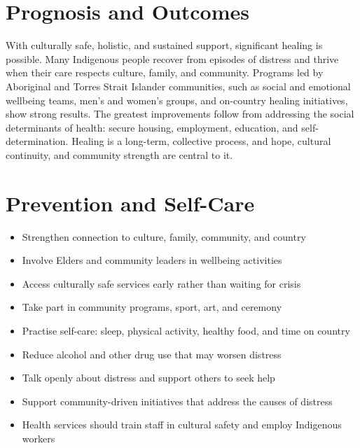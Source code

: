 \section*{Prognosis and Outcomes}
With culturally safe, holistic, and sustained support, significant healing is possible. Many Indigenous people recover from episodes of distress and thrive when their care respects culture, family, and community. Programs led by Aboriginal and Torres Strait Islander communities, such as social and emotional wellbeing teams, men's and women's groups, and on-country healing initiatives, show strong results. The greatest improvements follow from addressing the social determinants of health: secure housing, employment, education, and self-determination. Healing is a long-term, collective process, and hope, cultural continuity, and community strength are central to it.

\section*{Prevention and Self-Care}
\begin{itemize}
    \item Strengthen connection to culture, family, community, and country
    \item Involve Elders and community leaders in wellbeing activities
    \item Access culturally safe services early rather than waiting for crisis
    \item Take part in community programs, sport, art, and ceremony
    \item Practise self-care: sleep, physical activity, healthy food, and time on country
    \item Reduce alcohol and other drug use that may worsen distress
    \item Talk openly about distress and support others to seek help
    \item Support community-driven initiatives that address the causes of distress
    \item Health services should train staff in cultural safety and employ Indigenous workers
\end{itemize}


